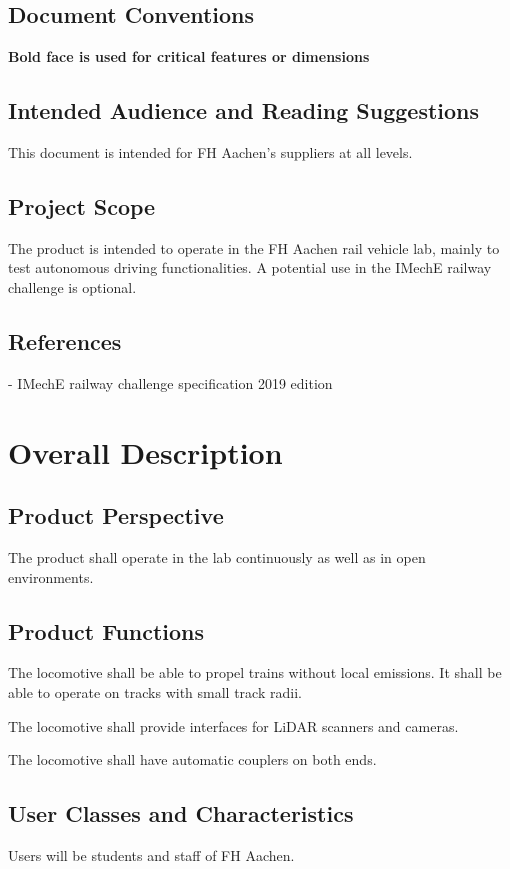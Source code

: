 \documentclass{scrreprt}
\begin{document}
\section{Document Conventions}
\textbf{Bold face is used for critical features or dimensions}

\section{Intended Audience and Reading Suggestions}
This document is intended for FH Aachen's suppliers at all levels.

\section{Project Scope}
The product is intended to operate in the FH Aachen rail vehicle lab, mainly to test autonomous driving functionalities. A potential use in the IMechE railway challenge is optional.

\section{References}
- IMechE railway challenge specification 2019 edition

\chapter{Overall Description}
\section{Product Perspective}
The product shall operate in the lab continuously as well as in open environments.

\section{Product Functions}
The locomotive shall be able to propel trains without local emissions. It shall be able to operate on tracks with small track radii.

The locomotive shall provide interfaces for LiDAR scanners and cameras. 

The locomotive shall have automatic couplers on both ends.

\section{User Classes and Characteristics}
Users will be students and staff of FH Aachen.
\end{document}
